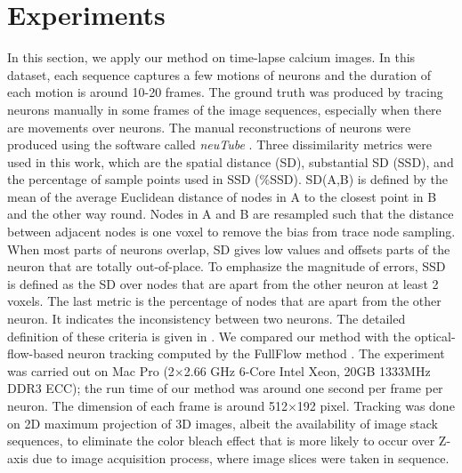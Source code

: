\documentclass{article}
\begin{document}
\section{Experiments}
In this section, we apply our method on time-lapse calcium images. In this dataset, each sequence captures a few motions of neurons and the duration of each motion is around 10-20 frames. The ground truth was produced by tracing neurons manually in some frames of the image sequences, especially when there are movements over neurons. The manual reconstructions of neurons were produced using the software called \emph{neuTube} \cite{Feng2015}. Three dissimilarity metrics were used in this work, which are the spatial distance (SD), substantial SD (SSD), and the percentage of sample points used in SSD (\%SSD). SD(A,B) is defined by the mean of the average Euclidean distance of nodes in A to the closest point in B and the other way round. Nodes in A and B are resampled such that the distance between adjacent nodes is one voxel to remove the bias from trace node sampling. When most parts of neurons overlap, SD gives low values and offsets parts of the neuron that are totally out-of-place. To emphasize the magnitude of errors, SSD is defined as the SD over nodes that are apart from the other neuron at least 2 voxels. The last metric is the percentage of nodes that are apart from the other neuron. It indicates the inconsistency between two neurons. The detailed definition of these criteria is given in \cite{Peng2010}. We compared our method with the optical-flow-based neuron tracking computed by the FullFlow method \cite{Chen2016}. The experiment was carried out on Mac Pro (2$\times$2.66 GHz 6-Core Intel Xeon, 20GB 1333MHz DDR3 ECC); the run time of our method was around one second per frame per neuron. The dimension of each frame is around 512$\times$192 pixel. Tracking was done on 2D maximum projection of 3D images, albeit the availability of image stack sequences, to eliminate the color bleach effect that is more likely to occur over Z-axis due to image acquisition process, where image slices were taken in sequence.
\end{document}
